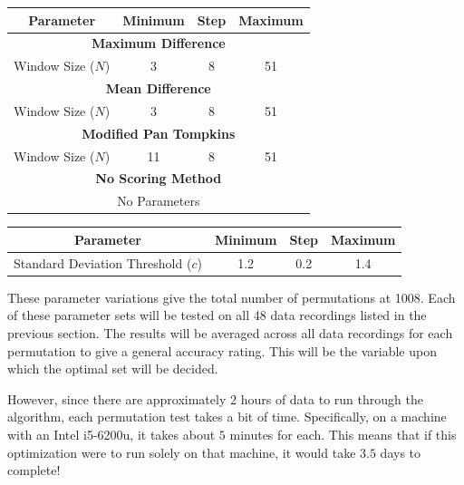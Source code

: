         \begin{center}
            \begin{tabular}{|c|c|c|c|}
                \hline
                Parameter & Minimum & Step & Maximum \\
                \hline
                \multicolumn{4}{|c|}{\textbf{Maximum Difference}} \\
                \hline
                Window Size ($N$) & 3 & 8 & 51 \\
                \hline
                \multicolumn{4}{|c|}{\textbf{Mean Difference}} \\
                \hline
                Window Size ($N$) & 3 & 8 & 51 \\
                \hline
                \multicolumn{4}{|c|}{\textbf{Modified Pan Tompkins}} \\
                \hline
                Window Size ($N$) & 11 & 8 & 51 \\
                \hline
                \multicolumn{4}{|c|}{\textbf{No Scoring Method}} \\
                \hline
                \multicolumn{4}{|c|}{No Parameters} \\
                \hline
            \end{tabular}
        \end{center}
        \begin{center}
            \begin{tabular}{|c|c|c|c|}
                \hline
                Parameter & Minimum & Step & Maximum \\
                \hline
                Standard Deviation Threshold ($c$) & 1.2 & 0.2 & 1.4 \\
                \hline
            \end{tabular}
        \end{center}

        These parameter variations give the total number of permutations at 1008. Each of these parameter sets will be tested on all 48 data recordings listed in the previous section. The results will be averaged across all data recordings for each permutation to give a general accuracy rating. This will be the variable upon which the optimal set will be decided. 

        However, since there are approximately $2$ hours of data to run through the algorithm, each permutation test takes a bit of time. Specifically, on a machine with an Intel i5-6200u, it takes about $5$ minutes for each. This means that if this optimization were to run solely on that machine, it would take $3.5$ days to complete! 

